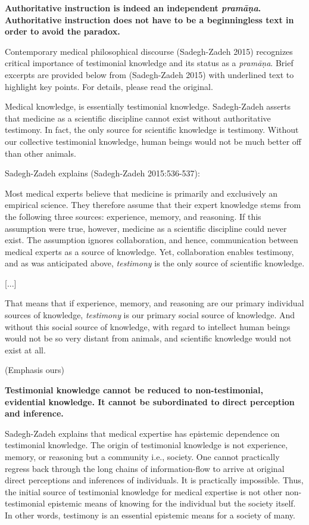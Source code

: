 {\bf Authoritative instruction is indeed an independent {{\sl\bfseries pramāṇa}\relax}.  Authoritative instruction does not have to be a beginningless text in order to avoid the paradox.}

Contemporary medical philosophical discourse (Sadegh-Zadeh 2015) recognizes critical importance of testimonial knowledge and its status as a {\sl pramāṇa}.  Brief excerpts are provided below from (Sadegh-Zadeh 2015) with underlined text to highlight key points. For details, please read the original.
  
Medical knowledge, is essentially testimonial knowledge. Sadegh-Zadeh  asserts that medicine as a scientific discipline cannot exist without authoritative testimony. In fact, the only source for scientific knowledge is testimony. Without our collective testimonial knowledge, human beings would not be much better off than other animals.  

Sadegh-Zadeh explains (Sadegh-Zadeh 2015:536-537):
\begin{myquote}
Most medical experts believe that medicine is primarily and exclusively an empirical science.  They therefore assume that their expert knowledge stems from the following three sources: experience, memory, and reasoning. If this assumption were true, however, medicine as a scientific discipline could never exist. The assumption ignores collaboration, and hence, communication between medical experts as a source of knowledge. Yet, collaboration enables testimony, and as was anticipated above, {\sl testimony} is the only source of scientific knowledge.

[...]

That means that if experience, memory, and reasoning are our primary individual sources of knowledge, {\sl testimony} is our primary social source of knowledge.  And without this social source of knowledge, with regard to intellect human beings would not be so very distant from animals, and scientific knowledge would not exist at all.

\hfill (Emphasis ours)
\end{myquote}

{\bf Testimonial knowledge cannot be reduced to non-testimonial, evidential knowledge. It cannot be subordinated to direct perception and inference.}

Sadegh-Zadeh explains that medical expertise has epistemic dependence on testimonial knowledge.  The origin of testimonial knowledge is not experience, memory, or reasoning but a community i.e., society.  One cannot practically regress back through the long chains of information-flow to arrive at original direct perceptions and inferences of individuals.  It is practically impossible.  Thus, the initial source of testimonial knowledge for medical expertise is not other non-testimonial epistemic means of knowing for the individual but the society itself.  In other words, testimony is an essential epistemic means for a society of many.

